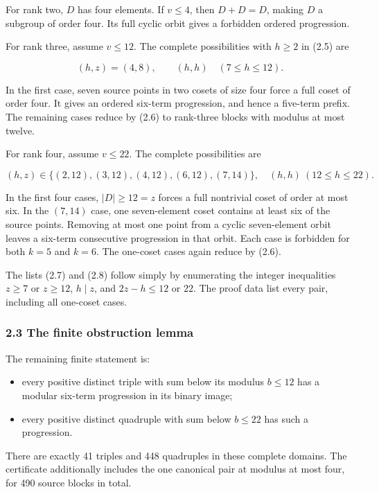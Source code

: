 For rank two, \(D\) has four elements. If \(v\le4\), then \(D+D=D\), making \(D\) a subgroup of order four. Its full cyclic orbit gives a forbidden ordered progression.

For rank three, assume \(v\le12\). The complete possibilities with \(h\ge2\) in (2.5) are

\[
(h,z)=(4,8),\qquad (h,h)\quad(7\le h\le12).
\tag{2.7}
\]

In the first case, seven source points in two cosets of size four force a full coset of order four. It gives an ordered six-term progression, and hence a five-term prefix. The remaining cases reduce by (2.6) to rank-three blocks with modulus at most twelve.

For rank four, assume \(v\le22\). The complete possibilities are

\[
(h,z)\in\{(2,12),(3,12),(4,12),(6,12),(7,14)\},
\quad (h,h)\ (12\le h\le22).
\tag{2.8}
\]

In the first four cases, \(|D|\ge12=z\) forces a full nontrivial coset of order at most six. In the \((7,14)\) case, one seven-element coset contains at least six of the source points. Removing at most one point from a cyclic seven-element orbit leaves a six-term consecutive progression in that orbit. Each case is forbidden for both \(k=5\) and \(k=6\). The one-coset cases again reduce by (2.6).

The lists (2.7) and (2.8) follow simply by enumerating the integer inequalities \(z\ge7\) or \(z\ge12\), \(h\mid z\), and \(2z-h\le12\) or \(22\). The proof data list every pair, including all one-coset cases.

\subsubsection{2.3 The finite obstruction lemma}\label{the-finite-obstruction-lemma}

The remaining finite statement is:

\begin{itemize}
\tightlist
\item
  every positive distinct triple with sum below its modulus \(b\le12\) has a modular six-term progression in its binary image;
\item
  every positive distinct quadruple with sum below \(b\le22\) has such a progression.
\end{itemize}

There are exactly 41 triples and 448 quadruples in these complete domains. The certificate additionally includes the one canonical pair at modulus at most four, for 490 source blocks in total.

